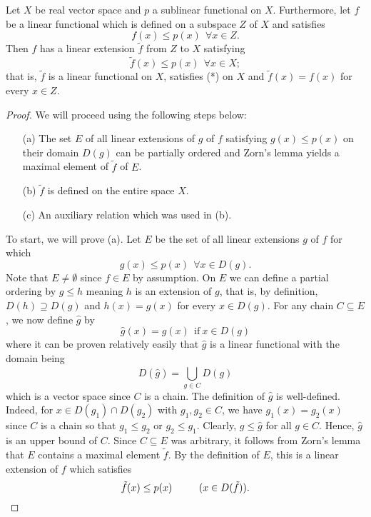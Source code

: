 \begin{theorem}
Let \( X  \) be real vector space and \( p  \) a sublinear functional on \( X  \). Furthermore, let \( f  \) be a linear functional which is defined on a subspace \( Z  \) of \( X  \) and satisfies   
\[  f(x) \leq p(x) \ \ \forall x \in Z.  \]
Then \( f  \) has a linear extension \( \tilde{f} \) from \( Z  \) to \( X  \) satisfying 
\[  \tilde{f}(x) \leq p(x) \ \ \forall x \in X; \tag{*} \]
that is, \( \tilde{f} \) is a linear functional on \( X  \), satisfies (*) on \( X  \) and \( \tilde{f}(x) = f(x) \) for every \( x \in Z  \).
\end{theorem}

\begin{proof}
We will proceed using the following steps below:
\begin{enumerate}
    \item[(a)] The set \( E  \) of all linear extensions of \( g  \) of \( f  \) satisfying \( g(x) \leq p(x)  \) on their domain \( D(g) \) can be partially ordered and Zorn's lemma yields a maximal element of \( \tilde{f}  \) of \( E  \).
    \item[(b)] \( \tilde{f} \) is defined on the entire space \( X  \). 
    \item[(c)] An auxiliary relation which was used in (b). 
\end{enumerate}

To start, we will prove (a). Let \( E  \) be the set of all linear extensions \( g \) of \( f  \) for which 
\[  g(x) \leq p(x) \ \ \forall x \in D(g). \]
Note that \( E \neq \emptyset  \) since \( f \in E  \) by assumption. On \( E  \) we can define a partial ordering by \( g \leq h  \) meaning \( h  \) is an extension of \( g \), that is, by definition, \( D(h) \supseteq D(g) \) and \( h(x) = g(x) \) for every \( x \in D(g) \). For any chain \( C \subseteq  E  \), we now define \( \hat{g} \) by
\[  \hat{g}(x) = g(x) \ \ \text{if} \ x \in D(g) \tag{\( g \in C  \)} \]
where it can be proven relatively easily that \( \hat{g}  \) is a linear functional with the domain being 
\[  D(\hat{g}) = \bigcup_{ g \in C  }^{  }  D(g) \]
which is a vector space since \( C  \) is a chain. The definition of \( \hat{g} \) is well-defined. Indeed, for \( x \in D({g}_{1}) \cap D({g}_{2}) \) with \( {g}_{1}, {g}_{2} \in C  \), we have \( {g}_{1}(x) = {g}_{2}(x) \) since \( C  \) is a chain so that \( {g}_{1} \leq {g}_{2} \) or \( {g}_{2} \leq {g}_{1} \). Clearly, \( g \leq \hat{g} \) for all \( g \in C  \). Hence, \( \hat{g} \) is an upper bound of \( C  \). Since \( C \subseteq  E  \) was arbitrary, it follows from Zorn's lemma that \( E  \) contains a maximal element \( \tilde{f} \). By the definition of \( E  \), this is a linear extension of \( f  \) which satisfies
\[  \tilde{f}(x) \leq p(x) \ \ \tag{\( x \in D(\tilde{f}) \)}. \]


\end{proof}
